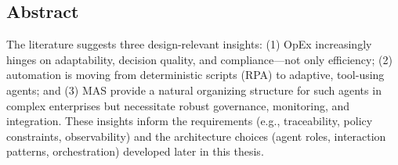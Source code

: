 
\begin{centering}
\section*{Abstract}
\end{centering}
The literature suggests three design-relevant insights: (1) OpEx increasingly hinges on adaptability, decision quality, and compliance—not only efficiency; (2) automation is moving from deterministic scripts (RPA) to adaptive, tool-using agents; and (3) MAS provide a natural organizing structure for such agents in complex enterprises but necessitate robust governance, monitoring, and integration. These insights inform the requirements (e.g., traceability, policy constraints, observability) and the architecture choices (agent roles, interaction patterns, orchestration) developed later in this thesis.
\newpage

\tableofcontents
\clearpage


\renewcommand{\nomname}{List of Abbreviations}
\setlength{\nomlabelwidth}{.25\hsize}
\renewcommand{\nomlabel}[1]{#1 \dotfill}
\setlength{\nomitemsep}{-\parsep}
{\small \printnomenclature}
\clearpage
{}
